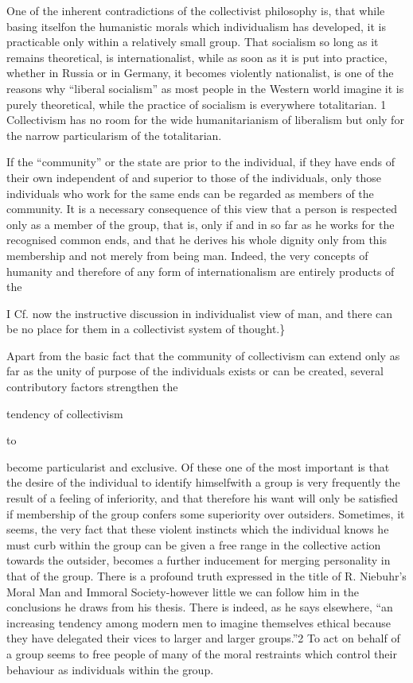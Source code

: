 \documentclass[11pt,openany]{book}
\begin{document}
One of the inherent contradictions of the collectivist philosophy is, that while basing itselfon the humanistic morals which individualism has developed, it is practicable only within a relatively small group. That socialism so long as it remains theoretical, is internationalist, while as soon as it is put into practice, whether in Russia or in Germany, it becomes violently nationalist, is one of the reasons why ``liberal socialism'' as most people in the Western world imagine it is purely theoretical, while the practice of socialism is everywhere totalitarian. 1 Collectivism has no room for the wide humanitarianism of liberalism but only for the narrow particularism of the totalitarian.

If the ``community'' or the state are prior to the individual, if they have ends of their own independent of and superior to those of the individuals, only those individuals who work for the same ends can be regarded as members of the community. It is a necessary consequence of this view that a person is respected only as a member of the group, that is, only if and in so far as he works for the recognised common ends, and that he derives his whole dignity only from this membership and not merely from being man. Indeed, the very concepts of humanity and therefore of any form of internationalism are entirely products of the

I Cf. now the instructive discussion in individualist view of man, and there can be no place for them in a collectivist system of thought.\}

Apart from the basic fact that the community of collectivism can extend only as far as the unity of purpose of the individuals exists or can be created, several contributory factors strengthen the

tendency of collectivism

to

become particularist and exclusive. Of these one of the most important is that the desire of the individual to identify himselfwith a group is very frequently the result of a feeling of inferiority, and that therefore his want will only be satisfied if membership of the group confers some superiority over outsiders. Sometimes, it seems, the very fact that these violent instincts which the individual knows he must curb within the group can be given a free range in the collective action towards the outsider, becomes a further inducement for merging personality in that of the group. There is a profound truth expressed in the title of R. Niebuhr's Moral Man and Immoral Society-however little we can follow him in the conclusions he draws from his thesis. There is indeed, as he says elsewhere, ``an increasing tendency among modern men to imagine themselves ethical because they have delegated their vices to larger and larger groups.''2 To act on behalf of a group seems to free people of many of the moral restraints which control their behaviour as individuals within the group.
\end{document}
